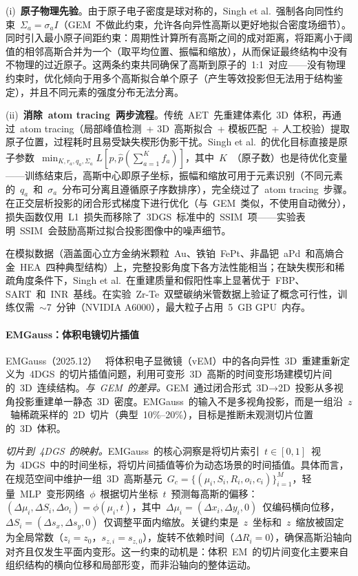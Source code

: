 (i)~\textbf{原子物理先验}。由于原子电子密度是球对称的，Singh et al.~强制各向同性约束~$\Sigma_a = \sigma_a I$（GEM~不做此约束，允许各向异性高斯以更好地拟合密度场细节）。同时引入最小原子间距约束：周期性计算所有高斯之间的成对距离，将距离小于阈值的相邻高斯合并为一个（取平均位置、振幅和缩放），从而保证最终结构中没有不物理的过近原子。这两条约束共同确保了高斯到原子的~1:1~对应——没有物理约束时，优化倾向于用多个高斯拟合单个原子（产生等效投影但无法用于结构鉴定），并且不同元素的强度分布无法分离。

(ii)~\textbf{消除~atom tracing~两步流程}。传统~AET~先重建体素化~3D~体积，再通过~atom tracing（局部峰值检测~+ 3D~高斯拟合~+ 模板匹配~+ 人工校验）提取原子位置，过程耗时且易受缺失楔形伪影干扰。Singh et al.~的优化目标直接是原子参数~$\min_{K, r_a, q_a, \Sigma_a} L[p, \hat{p}(\sum_{a=1}^{K} f_a)]$，其中~$K$~（原子数）也是待优化变量——训练结束后，高斯中心即原子坐标，振幅和缩放可用于元素识别（不同元素的~$q_a$~和~$\sigma_a$~分布可分离且遵循原子序数排序），完全绕过了~atom tracing~步骤。在正交层析投影的闭合形式梯度下进行优化（与~GEM~类似，不使用自动微分），损失函数仅用~L1~损失而移除了~3DGS~标准中的~SSIM~项——实验表明~SSIM~会鼓励高斯过拟合投影图像中的噪声细节。

在模拟数据（涵盖面心立方金纳米颗粒~Au、铁铂~FePt、非晶钯~aPd~和高熵合金~HEA~四种典型结构）上，完整投影角度下各方法性能相当；在缺失楔形和稀疏角度条件下，Singh et al.~在重建质量和假阳性率上显著优于~FBP、SART~和~INR~基线。在实验~Zr-Te~双壁碳纳米管数据上验证了概念可行性，训练仅需~$\sim$7~分钟（NVIDIA A6000），最大粒子占用~5~GB GPU~内存。

\paragraph{EMGauss：体积电镜切片插值}

EMGauss（2025.12）~\cite{2512_06684} 将体积电子显微镜（vEM）中的各向异性~3D~重建重新定义为~4DGS~的切片插值问题，利用可变形~3D~高斯的时间变形场建模切片间的~3D~连续结构。\textit{与~GEM~的差异。}GEM~通过闭合形式~3D→2D~投影从多视角投影重建单一静态~3D~密度。EMGauss~的输入不是多视角投影，而是一组沿~$z$~轴稀疏采样的~2D~切片（典型~10\%--20\%），目标是推断未观测切片位置的~3D~体积。

\textit{切片到~4DGS~的映射。}EMGauss~的核心洞察是将切片索引~$t \in [0,1]$~视为~4DGS~中的时间坐标，将切片间插值等价为动态场景的时间插值。具体而言，在规范空间中维护一组~3D~高斯基元~$G_c = \{(\mu_i, S_i, R_i, o_i, c_i)\}_{i=1}^M$，轻量~MLP~变形网络~$\phi$~根据切片坐标~$t$~预测每高斯的偏移：$(\Delta\mu_i, \Delta S_i, \Delta o_i) = \phi(\mu_i, t)$，其中~$\Delta\mu_i = (\Delta x_i, \Delta y_i, 0)$~仅编码横向位移，$\Delta S_i = (\Delta s_x, \Delta s_y, 0)$~仅调整平面内缩放。关键约束是~$z$~坐标和~$z$~缩放被固定为全局常数（$z_i = z_0$，$s_{z,i} = s_{z,0}$），旋转不依赖时间（$\Delta R_i = 0$），确保高斯沿轴向对齐且仅发生平面内变形。这一约束的动机是：体积~EM~的切片间变化主要来自组织结构的横向位移和局部形变，而非沿轴向的整体运动。

